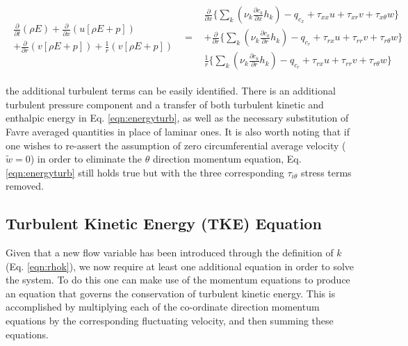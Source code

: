 \begin{displaymath}
	\begin{array}{ccc}
		\begin{array}{c}
		\frac{\partial}{\partial t}(\rho E) +\frac{\partial}{\partial x}(u[\rho E + p]) \\
		+ \frac{\partial}{\partial r}(v[\rho E + p]) + \frac{1}{r}(v[\rho E + p])
		\end{array} & = &
		\begin{array}{c}
			\frac{\partial}{\partial x}\Big\{
			\sum_k (\nu_k \frac{\partial c_k}{\partial x}h_k) 
			- q_{c_x} +   \tau_{xx}u + \tau_{xr}v + \tau_{x\theta}w\Big\} \\
			+ \frac{\partial}{\partial r}\Big\{
			\sum_k (\nu_k \frac{\partial c_k}{\partial r}h_k)
			-  q_{c_r} + \tau_{rx}u +  \tau_{rr}v  + \tau_{r\theta}w\Big\} \\
			\frac{1}{r}\Big\{\sum_k (\nu_k \frac{\partial c_k}{\partial r}h_k) - q_{c_r} + \tau_{rx}u 
			+ \tau_{rr}v + \tau_{r\theta}w\Big\}
		\end{array}  
	\end{array}
\end{displaymath}

	the additional turbulent terms can be easily identified.  There is an additional turbulent pressure component and
a transfer of both turbulent kinetic and enthalpic energy in Eq. \ref{eqn:energyturb}, as well as the necessary substitution
of Favre averaged quantities in place of laminar ones.  It is also worth noting that if one wishes to re-assert the 
assumption of zero circumferential average velocity ($\tilde w = 0$) in order to eliminate the $\theta$ direction
momentum equation, Eq. \ref{eqn:energyturb} still holds true but with the three corresponding $\tau_{i\theta}$ stress terms removed.

\subsection{Turbulent Kinetic Energy (TKE) Equation} 

	Given that a new flow variable has been introduced through the definition of $k$ (Eq. \ref{eqn:rhok}), we 
now require at least one additional equation in order to solve the system.  To do this one can make use of the
momentum equations to produce an equation that governs the conservation of turbulent kinetic energy.  This is 
accomplished by multiplying each of the co-ordinate direction momentum equations by the corresponding fluctuating
velocity, and then summing these equations.  


